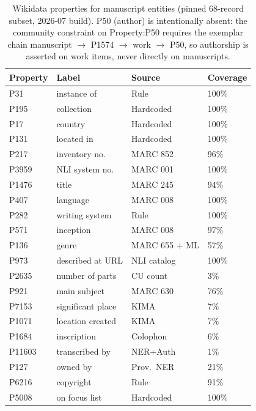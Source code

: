 \documentclass[Afour,sageh,times]{sagej}
\begin{document}
\begin{table}[t]
\caption{Wikidata properties for manuscript entities (pinned 68-record subset, 2026-07 build). P50 (author) is intentionally absent: the community constraint on Property:P50 requires the exemplar chain manuscript $\to$ P1574 $\to$ work $\to$ P50, so authorship is asserted on work items, never directly on manuscripts.}
\label{tab:manuscript-props}
\centering
\footnotesize
\setlength{\tabcolsep}{3.5pt}
\begin{tabular}{llll}
\toprule
\textbf{Property} & \textbf{Label} & \textbf{Source} & \textbf{Coverage} \\
\midrule
P31  & instance of      & Rule       & 100\% \\
P195 & collection       & Hardcoded  & 100\% \\
P17  & country          & Hardcoded  & 100\% \\
P131 & located in       & Hardcoded  & 100\% \\
P217 & inventory no.    & MARC 852   & 96\% \\
P3959& NLI system no.   & MARC 001   & 100\% \\
P1476& title            & MARC 245   & 94\%  \\
P407 & language         & MARC 008   & 100\% \\
P282 & writing system   & Rule       & 100\% \\
P571 & inception        & MARC 008   & 97\%  \\
P136 & genre            & MARC 655 + ML & 57\%  \\
P973 & described at URL & NLI catalog & 100\% \\
P2635& number of parts  & CU count   & 3\%  \\
P921 & main subject     & MARC 630   & 76\%  \\
P7153& significant place& KIMA       & 7\%  \\
P1071& location created & KIMA       & 7\%  \\
P1684& inscription      & Colophon   & 6\%  \\
P11603&transcribed by   & NER+Auth   & 1\%  \\
P127 & owned by         & Prov.\ NER & 21\%  \\
P6216& copyright        & Rule       & 91\% \\
P5008& on focus list    & Hardcoded  & 100\% \\
\bottomrule
\end{tabular}
\end{table}
\end{document}
